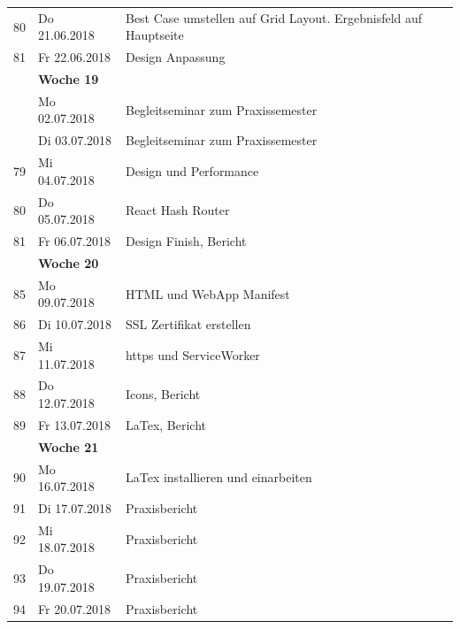 \documentclass{article}
\begin{document}
{\begin{tabular}{l|p{2.5cm}|p{15cm}}
			80 & Do 21.06.2018  & 
			Best Case umstellen auf Grid Layout. Ergebnisfeld auf Hauptseite\\

			81 & Fr 22.06.2018 & 
			Design Anpassung \\
			

			& \textbf{Woche 19}&\\
		
		
			& Mo 02.07.2018	  & 
			Begleitseminar zum Praxissemester\\

			& Di 03.07.2018	  & 
			Begleitseminar zum Praxissemester\\

			79 & Mi 04.07.2018			 & 
			Design und Performance\\

			80 & Do 05.07.2018  & 
			React Hash Router\\

			81 & Fr 06.07.2018 & 
			Design Finish, Bericht\\
			
	

			& \textbf{Woche 20}&\\
			
			
			85 & Mo 09.07.2018  & 
			HTML und WebApp Manifest\\

			86 & Di 10.07.2018	  & 
			SSL Zertifikat erstellen\\

			87 & Mi 11.07.2018			 & 
			https und ServiceWorker\\

			88 & Do 12.07.2018  & 
			Icons, Bericht\\

			89 & Fr 13.07.2018 & 
			LaTex, Bericht\\


			& \textbf{Woche 21}&\\

			
			90 & Mo 16.07.2018  & 
			LaTex installieren und einarbeiten\\

			91 & Di 17.07.2018	  & 
			Praxisbericht\\

			92 & Mi 18.07.2018			 & 
			Praxisbericht\\

			93 & Do 19.07.2018  & 
			Praxisbericht\\

			94 & Fr 20.07.2018 & 
			Praxisbericht\\


\end{tabular}}
\end{document}
